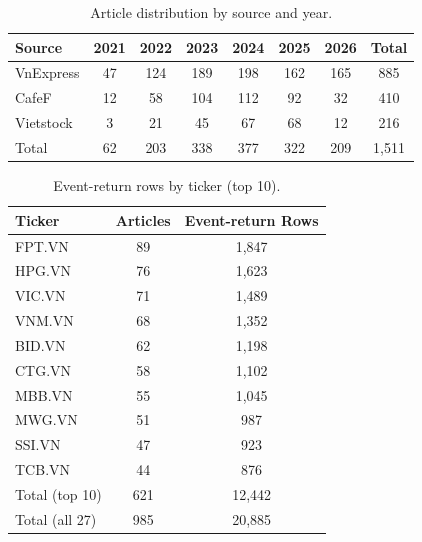 \documentclass[runningheads]{llncs}
\begin{document}
\begin{table}[htbp]
\centering
\caption{Article distribution by source and year.}
\label{tabdata-dist-source}
\begin{tabular}{lccccccc}
\toprule
Source & 2021 & 2022 & 2023 & 2024 & 2025 & 2026 & Total \\
\midrule
VnExpress & 47 & 124 & 189 & 198 & 162 & 165 & 885 \\
CafeF & 12 & 58 & 104 & 112 & 92 & 32 & 410 \\
Vietstock & 3 & 21 & 45 & 67 & 68 & 12 & 216 \\
\midrule
Total & 62 & 203 & 338 & 377 & 322 & 209 & 1{,}511 \\
\bottomrule
\end{tabular}
\end{table}

\begin{table}[htbp]
\centering
\caption{Event-return rows by ticker (top 10).}
\label{tabdata-dist-ticker}
\begin{tabular}{lcc}
\toprule
Ticker & Articles & Event-return Rows \\
\midrule
FPT.VN & 89 & 1{,}847 \\
HPG.VN & 76 & 1{,}623 \\
VIC.VN & 71 & 1{,}489 \\
VNM.VN & 68 & 1{,}352 \\
BID.VN & 62 & 1{,}198 \\
CTG.VN & 58 & 1{,}102 \\
MBB.VN & 55 & 1{,}045 \\
MWG.VN & 51 & 987 \\
SSI.VN & 47 & 923 \\
TCB.VN & 44 & 876 \\
\midrule
Total (top 10) & 621 & 12{,}442 \\
Total (all 27) & 985 & 20{,}885 \\
\bottomrule
\end{tabular}
\end{table}
\end{document}
